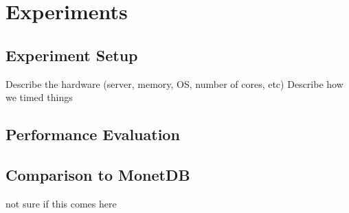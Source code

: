 \section{Experiments}
\subsection{Experiment Setup}
Describe the hardware (server, memory, OS, number of cores, etc)
Describe how we timed things
\subsection{Performance Evaluation}
\subsection{Comparison to MonetDB}
not sure if this comes here
\label{sec:experiments}
